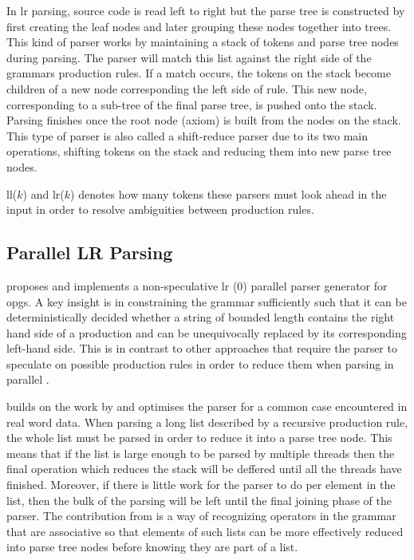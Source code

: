 In \gls{lr} parsing, source code is read left to right but the parse tree is
constructed by first creating the leaf nodes and later grouping these nodes
together into trees. This kind of parser works by maintaining a stack of tokens
and parse tree nodes during parsing. The parser will match this list against
the right side of the grammars production rules. If a match occurs, the tokens
on the stack become children of a new node corresponding the left side of rule.
This new node, corresponding to a sub-tree of the final parse tree, is pushed
onto the stack. Parsing finishes once the root node (axiom) is built from the
nodes on the stack. This type of parser is also called a shift-reduce parser due
to its two main operations, shifting tokens on the stack and reducing them into
new parse tree nodes.

\gls{ll}($k$) and \gls{lr}($k$) denotes how many tokens these parsers must look
ahead in the input in order to resolve ambiguities between production rules.

\subsection{Parallel LR Parsing} \label{parallel_lr_parsing}

\cite{barenghi_parallel_2015} proposes and implements a non-speculative \gls{lr}
(0) parallel parser generator for \gls{opg}s. A key insight is in constraining
the grammar sufficiently such that it can be deterministically decided whether
a string of bounded length contains the right hand side of a production
and can be unequivocally replaced by its corresponding left-hand side. This
is in contrast to other approaches that require the parser to speculate on
possible production rules in order to reduce them when parsing in parallel
\citep{mickunas_parallel_1978}.

\cite{li_associative_2023} builds on the work by \cite{barenghi_parallel_2015}
and optimises the parser for a common case encountered in real word data. When
parsing a long list described by a recursive production rule, the whole list
must be parsed in order to reduce it into a parse tree node. This means that
if the list is large enough to be parsed by multiple threads then the final
operation which reduces the stack will be deffered until all the threads have
finished. Moreover, if there is little work for the parser to do per element
in the list, then the bulk of the parsing will be left until the final joining
phase of the parser. The contribution from \cite{li_associative_2023} is a way
of recognizing operators in the grammar that are associative so that elements of
such lists can be more effectively reduced into parse tree nodes before knowing
they are part of a list.


